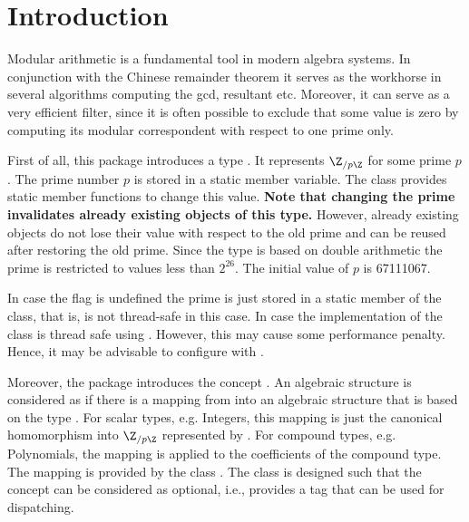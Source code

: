 \cleardoublepage
{}



\section{Introduction}

Modular arithmetic is a fundamental tool in modern algebra systems. 
In conjunction with the Chinese remainder theorem it serves as the 
workhorse in several algorithms computing the gcd, resultant etc. 
Moreover, it can serve as a very efficient filter, since it is often 
possible to exclude that some value is zero by computing its modular 
correspondent with respect to one prime only. 

First of all, this package introduces a type .
It represents $\Z_{/p\Z}$ for some prime $p$. 
The prime number $p$ is stored in a static member variable. 
The class provides static member functions to change this value. 
{\bf Note that changing the prime invalidates already existing objects 
of this type.}
However, already existing objects do not lose their value with respect to the 
old prime and can be reused after restoring the old prime. 
Since the type is based on double 
arithmetic the prime is restricted to values less than $2^{26}$. 
The initial value of $p$ is 67111067. 

\begin{ccAdvanced}      
In case the flag  
is undefined the prime is just stored in a static member 
of the class, that is,  is not thread-safe in this case.  
In case 
the implementation of the class is thread safe using 
. However, this may cause some performance 
penalty. Hence, it may be advisable to configure  with 
. 
\end{ccAdvanced} 

Moreover, the package introduces the concept . 
An algebraic structure  is considered as  if there 
is a mapping from  into an algebraic structure that is based on 
the type .  
For scalar types, e.g. Integers, this mapping is just the canonical 
homomorphism into $\Z_{/p\Z}$ represented by . 
For compound types, e.g. Polynomials, the mapping is applied to the 
coefficients of the compound type. 
The mapping is provided by the class .
The class  is designed such that the concept 
 can be considered as optional, i.e., 
 provides a tag that can be used for dispatching. 

